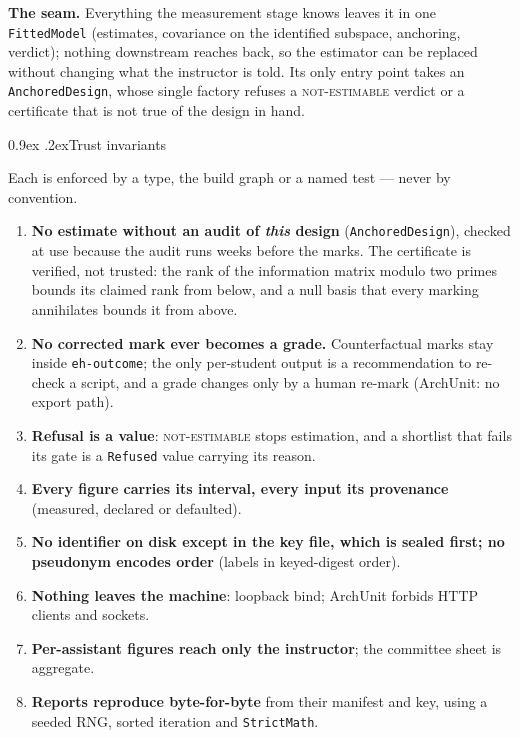 \documentclass[10pt,a4paper]{article}
\makeatletter
\renewcommand\subsection{\@startsection{subsection}{2}{\z@}{-2.4ex \@plus -.5ex \@minus -.2ex}%
  {0.9ex \@plus .2ex}{\normalfont\large\bfseries}}
\makeatother
\begin{document}
\textbf{The seam.} Everything the measurement stage knows leaves it in one \texttt{FittedModel}
(estimates, covariance on the identified subspace, anchoring, verdict); nothing downstream reaches
back, so the estimator can be replaced without changing what the instructor is told. Its only entry
point takes an \texttt{AnchoredDesign}, whose single factory refuses a \textsc{not-estimable}
verdict or a certificate that is not true of the design in hand.

\subsection{Trust invariants}

Each is enforced by a type, the build graph or a named test --- never by convention.
\begin{enumerate}[label=I\arabic*.]
\item \textbf{No estimate without an audit of \emph{this} design} (\texttt{AnchoredDesign}), checked
at use because the audit runs weeks before the marks. The certificate is verified, not trusted: the
rank of the information matrix modulo two primes bounds its claimed rank from below, and a null
basis that every marking annihilates bounds it from above.
\item \textbf{No corrected mark ever becomes a grade.} Counterfactual marks stay inside
\texttt{eh-outcome}; the only per-student output is a recommendation to re-check a script, and a
grade changes only by a human re-mark (ArchUnit: no export path).
\item \textbf{Refusal is a value}: \textsc{not-estimable} stops estimation, and a shortlist that
fails its gate is a \texttt{Refused} value carrying its reason.
\item \textbf{Every figure carries its interval, every input its provenance} (measured, declared or
defaulted).
\item \textbf{No identifier on disk except in the key file, which is sealed first; no pseudonym
encodes order} (labels in keyed-digest order).
\item \textbf{Nothing leaves the machine}: loopback bind; ArchUnit forbids HTTP clients and sockets.
\item \textbf{Per-assistant figures reach only the instructor}; the committee sheet is aggregate.
\item \textbf{Reports reproduce byte-for-byte} from their manifest and key, using a seeded RNG,
sorted iteration and \texttt{StrictMath}.
\end{enumerate}
\end{document}
